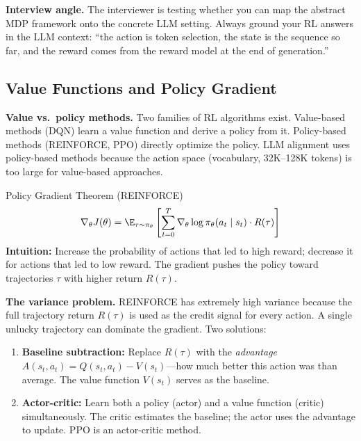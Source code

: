 \textbf{Interview angle.} The interviewer is testing whether you can map the abstract MDP framework onto the concrete LLM setting. Always ground your RL answers in the LLM context: ``the action is token selection, the state is the sequence so far, and the reward comes from the reward model at the end of generation.''

\subsection{Value Functions and Policy Gradient}

\textbf{Value vs.\ policy methods.} Two families of RL algorithms exist. Value-based methods (DQN) learn a value function and derive a policy from it. Policy-based methods (REINFORCE, PPO) directly optimize the policy. LLM alignment uses policy-based methods because the action space (vocabulary, 32K--128K tokens) is too large for value-based approaches.

\begin{mathresult}{Policy Gradient Theorem (REINFORCE)}
\begin{equation}
\nabla_\theta J(\theta) = \E_{\tau \sim \pi_\theta}\left[\sum_{t=0}^{T} \nabla_\theta \log \pi_\theta(a_t \mid s_t) \cdot R(\tau)\right]
\end{equation}
\textbf{Intuition:} Increase the probability of actions that led to high reward; decrease it for actions that led to low reward. The gradient pushes the policy toward trajectories $\tau$ with higher return $R(\tau)$.
\end{mathresult}

\textbf{The variance problem.} REINFORCE has extremely high variance because the full trajectory return $R(\tau)$ is used as the credit signal for every action. A single unlucky trajectory can dominate the gradient. Two solutions:

\begin{enumerate}
    \item \textbf{Baseline subtraction:} Replace $R(\tau)$ with the \textit{advantage} $A(s_t, a_t) = Q(s_t, a_t) - V(s_t)$---how much better this action was than average. The value function $V(s_t)$ serves as the baseline.
    \item \textbf{Actor-critic:} Learn both a policy (actor) and a value function (critic) simultaneously. The critic estimates the baseline; the actor uses the advantage to update. PPO is an actor-critic method.
\end{enumerate}

